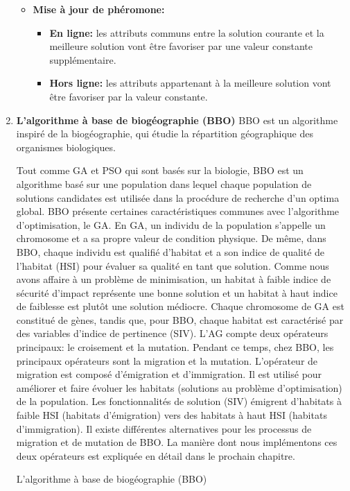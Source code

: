 \begin{enumerate}[label=\alph*)]
\begin{itemize}
	\item \textbf{Mise à jour de phéromone:}
		\begin{itemize}
			\item \textbf{En ligne:} les attributs communs entre la solution courante et la meilleure solution vont être favoriser par une valeur constante supplémentaire.
			\item \textbf{Hors ligne:} les attributs appartenant à la meilleure solution vont être favoriser par la valeur constante. 
		\end{itemize}
\end{itemize}
	
	\item \textbf{L’algorithme à base de biogéographie (BBO)} BBO est un algorithme inspiré de la biogéographie, qui étudie la répartition géographique des organismes biologiques. 

Tout comme GA et PSO qui sont basés sur la biologie, BBO est un algorithme basé sur une population dans lequel chaque population de solutions candidates est utilisée dans la procédure de recherche d’un optima global. BBO présente certaines caractéristiques communes avec l’algorithme d'optimisation, le GA. En GA, un individu de la population s'appelle un chromosome et a sa propre valeur de condition physique. De même, dans BBO, chaque individu est qualifié d'habitat et a son indice de qualité de l'habitat (HSI) pour évaluer sa qualité en tant que solution. Comme nous avons affaire à un problème de minimisation, un habitat à faible indice de sécurité d'impact représente une bonne solution et un habitat à haut indice de faiblesse est plutôt une solution médiocre. Chaque chromosome de GA est constitué de gènes, tandis que, pour BBO, chaque habitat est caractérisé par des variables d'indice de pertinence (SIV). L'AG compte deux opérateurs principaux: le croisement et la mutation. Pendant ce temps, chez BBO, les principaux opérateurs sont la migration et la mutation. L'opérateur de migration est composé d'émigration et d'immigration. Il est utilisé pour améliorer et faire évoluer les habitats (solutions au problème d'optimisation) de la population. Les fonctionnalités de solution (SIV) émigrent d'habitats à faible HSI (habitats d'émigration) vers des habitats à haut HSI (habitats d'immigration). Il existe différentes alternatives pour les processus de migration et de mutation de BBO. La manière dont nous implémentons ces deux opérateurs est expliquée en détail dans le prochain chapitre. 

\begin{algorithm}[H]
\caption{L’algorithme à base de biogéographie (BBO)}
\SetAlgoLined
\DontPrintSemicolon


\end{algorithm}
\end{enumerate}
